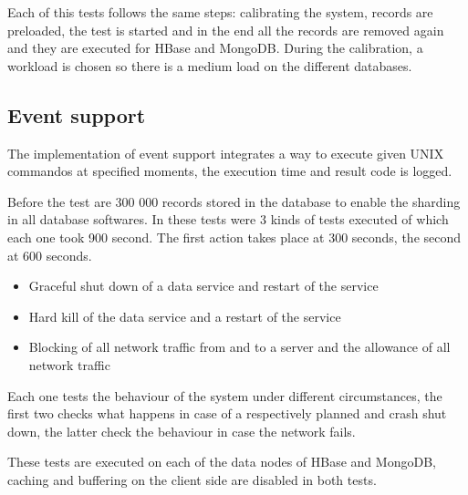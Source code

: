\documentclass[final,5p,times]{elsarticle}
\begin{document}
Each of this tests follows the same steps: calibrating the system, records are preloaded, the test is started and in the end all the records are removed again and they are executed for HBase and MongoDB. During the calibration, a workload is chosen so there is a medium load on the different databases. 

\subsection{Event support}
The implementation of event support integrates a way to execute given UNIX commandos at specified moments, the execution time and result code is logged. 

Before the test are 300 000 records stored in the database to enable the sharding in all database softwares. In these tests were 3 kinds of tests executed of which each one took 900 second. The first action takes place at 300 seconds, the second at 600 seconds.
\begin{itemize}
\item Graceful shut down of a data service and restart of the service
\item Hard kill of the data service and a restart of the service
\item Blocking of all network traffic from and to a server and the allowance of all network traffic
\end{itemize}

Each one tests the behaviour of the system under different circumstances, the first two checks what happens in case of a respectively planned and crash shut down, the latter check the behaviour in case the network fails. 

These tests are executed on each of the data nodes of HBase and MongoDB, caching and buffering on the client side are disabled in both tests. 
\end{document}
